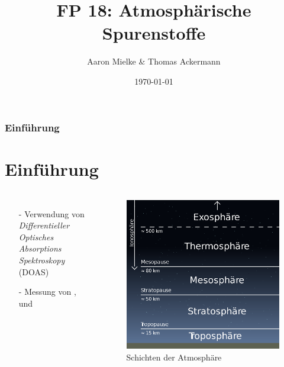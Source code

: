 \documentclass{beamer}
\title{FP 18: Atmosphärische Spurenstoffe}
\author{Aaron Mielke \& Thomas Ackermann}
\date{\today}
\begin{document}
\maketitle


\begin{frame}
	\frametitle{Einführung}
    \section{Einführung}
    \begin{columns}
        \begin{itemize}
            \item[-] Verwendung von
                \textit{Differentieller Optisches Absorptions Spektroskopy} (DOAS)
            \item[-] Messung von ,  und  
        \end{itemize}
    \begin{figure}
        \includegraphics[width=\textwidth]{fig/photo/erdatmosphäre.png}
        \caption{Schichten der Atmosphäre \cite{amt_zones}}
    \end{figure}
    \end{columns}
\end{frame}
\end{document}

